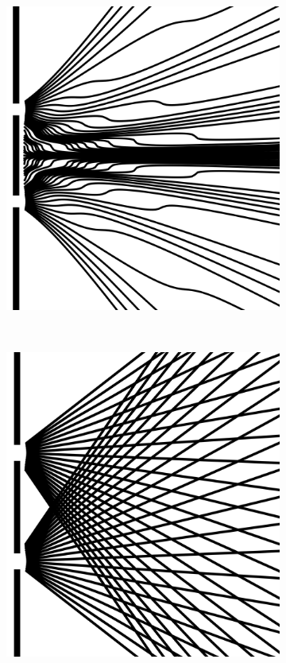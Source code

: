 \documentclass[12pt]{article}
\numberwithin{equation}{section}
\begin{document}
\begin{figure}[H]
 		\centering
 		\begin{subfigure}[b]{0.3\textwidth}
 	  			\includegraphics[width=\textwidth]{interference.png}
   				\caption{}
   				\label{fig:s1}
 		\end{subfigure}
 		~
 		\begin{subfigure}[b]{0.3\textwidth}
   				\includegraphics[width=\textwidth]{straight.png}

\end{subfigure}
\end{figure}
\end{document}
